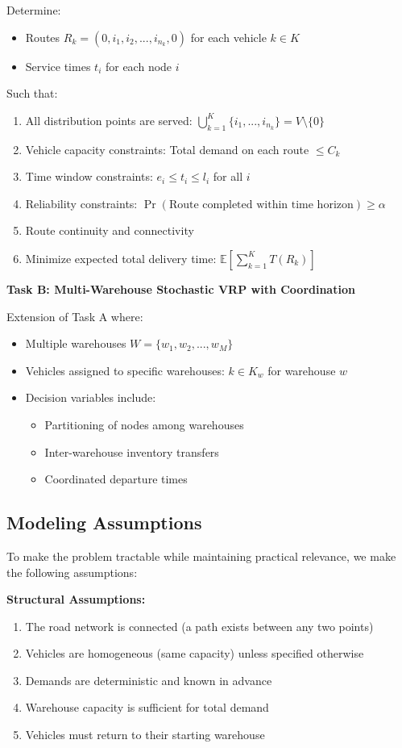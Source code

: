 Determine:
\begin{itemize}
\item Routes $R_k = (0, i_1, i_2, ..., i_{n_k}, 0)$ for each vehicle $k \in K$
\item Service times $t_i$ for each node $i$
\end{itemize}

Such that:
\begin{enumerate}
\item All distribution points are served: $\bigcup_{k=1}^{K} \{i_1, ..., i_{n_k}\} = V \setminus \{0\}$
\item Vehicle capacity constraints: Total demand on each route $\leq C_k$
\item Time window constraints: $e_i \leq t_i \leq l_i$ for all $i$
\item Reliability constraints: $\Pr(\text{Route completed within time horizon}) \geq \alpha$
\item Route continuity and connectivity
\item Minimize expected total delivery time: $\mathbb{E}[\sum_{k=1}^{K} T(R_k)]$
\end{enumerate}

\textbf{Task B: Multi-Warehouse Stochastic VRP with Coordination}

Extension of Task A where:
\begin{itemize}
\item Multiple warehouses $W = \{w_1, w_2, ..., w_M\}$
\item Vehicles assigned to specific warehouses: $k \in K_w$ for warehouse $w$
\item Decision variables include:
\begin{itemize}
\item Partitioning of nodes among warehouses
\item Inter-warehouse inventory transfers
\item Coordinated departure times
\end{itemize}
\end{itemize}

\subsection{Modeling Assumptions}

To make the problem tractable while maintaining practical relevance, we make the following assumptions:

\textbf{Structural Assumptions:}
\begin{enumerate}
\item The road network is connected (a path exists between any two points)
\item Vehicles are homogeneous (same capacity) unless specified otherwise
\item Demands are deterministic and known in advance
\item Warehouse capacity is sufficient for total demand
\item Vehicles must return to their starting warehouse
\end{enumerate}

